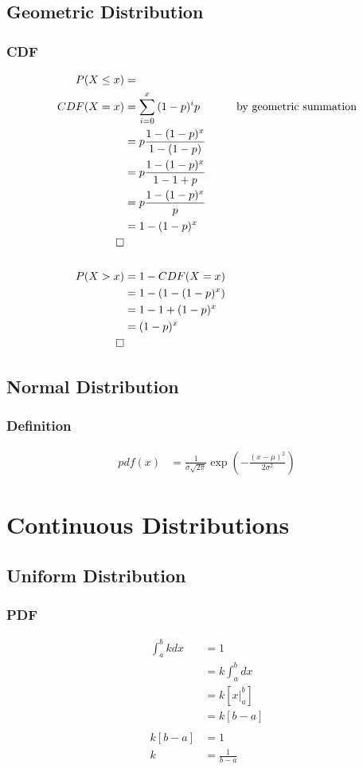 \documentclass[]{book}
\begin{document}
\section {Geometric Distribution}

\subsection {CDF}

\begin{align*}
	P(X \le x) &=\\
	CDF(X=x) &= \sum_{i=0}^{x}{(1-p)^ip} &\text{by geometric summation}\\
	&= p\frac{1-(1-p)^x}{1-(1-p)}\\
	&= p\frac{1-(1-p)^x}{1-1+p}\\
	&= p\frac{1-(1-p)^x}{p}\\	
	&= 1-(1-p)^x\\	
	\qed\\
	\\
	P(X > x) &= 1 - CDF(X=x)\\
	&= 1 - (1-(1-p)^x)\\
	&= 1 - 1 +(1-p)^x\\	
	&= (1-p)^x\\	
	\qed
\end{align*}

\section {Normal Distribution}

\subsection {Definition}

\begin{align}
pdf(x) &= \frac{1}{\sigma\sqrt{2\pi}}\exp\left(-\frac{(x-\mu)^2}{2\sigma^2}\right)
\end{align}

\chapter{Continuous Distributions}

\section{Uniform Distribution}

\subsection{PDF}
\begin{align*}
\int_{a}^{b} {kdx} &= 1\\
&= k\int_{a}^{b} {dx}\\
&= k[x|_{a}^{b}]\\
&= k[b-a]\\	
\\
k[b-a] &= 1\\
k &= \frac{1} {b-a}\\
\end{align*}
\end{document}
